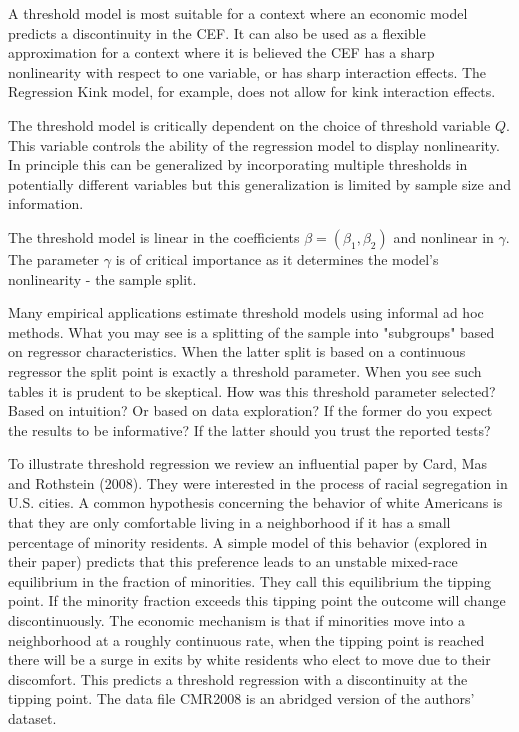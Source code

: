 \documentclass[10pt]{article}
\begin{document}
A threshold model is most suitable for a context where an economic model predicts a discontinuity in the CEF. It can also be used as a flexible approximation for a context where it is believed the CEF has a sharp nonlinearity with respect to one variable, or has sharp interaction effects. The Regression Kink model, for example, does not allow for kink interaction effects.

The threshold model is critically dependent on the choice of threshold variable $Q$. This variable controls the ability of the regression model to display nonlinearity. In principle this can be generalized by incorporating multiple thresholds in potentially different variables but this generalization is limited by sample size and information.

The threshold model is linear in the coefficients $\beta=\left(\beta_{1}, \beta_{2}\right)$ and nonlinear in $\gamma$. The parameter $\gamma$ is of critical importance as it determines the model's nonlinearity - the sample split.

Many empirical applications estimate threshold models using informal ad hoc methods. What you may see is a splitting of the sample into "subgroups" based on regressor characteristics. When the latter split is based on a continuous regressor the split point is exactly a threshold parameter. When you see such tables it is prudent to be skeptical. How was this threshold parameter selected? Based on intuition? Or based on data exploration? If the former do you expect the results to be informative? If the latter should you trust the reported tests?

To illustrate threshold regression we review an influential paper by Card, Mas and Rothstein (2008). They were interested in the process of racial segregation in U.S. cities. A common hypothesis concerning the behavior of white Americans is that they are only comfortable living in a neighborhood if it has a small percentage of minority residents. A simple model of this behavior (explored in their paper) predicts that this preference leads to an unstable mixed-race equilibrium in the fraction of minorities. They call this equilibrium the tipping point. If the minority fraction exceeds this tipping point the outcome will change discontinuously. The economic mechanism is that if minorities move into a neighborhood at a roughly continuous rate, when the tipping point is reached there will be a surge in exits by white residents who elect to move due to their discomfort. This predicts a threshold regression with a discontinuity at the tipping point. The data file CMR2008 is an abridged version of the authors' dataset.
\end{document}
